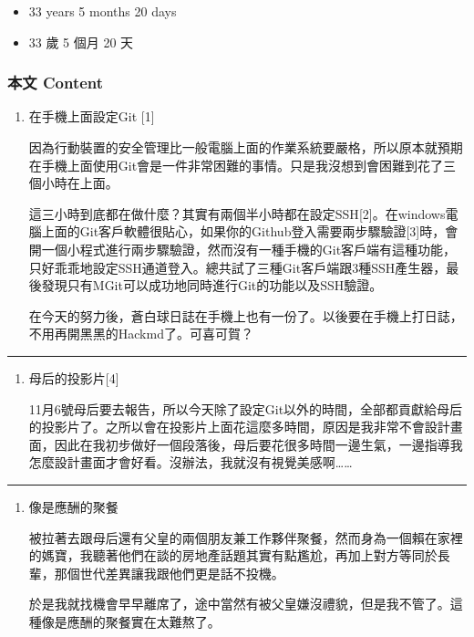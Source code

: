 \documentclass[
]{article}
\providecommand{\tightlist}{%
  \setlength{\itemsep}{0pt}\setlength{\parskip}{0pt}}
\begin{document}
\begin{itemize}
\tightlist
\item
  33 years 5 months 20 days
\item
  33 歲 5 個月 20 天
\end{itemize}

\hypertarget{ux672cux6587-content-12}{%
\subsubsection{本文 Content}\label{ux672cux6587-content-12}}

\begin{enumerate}
\def\labelenumi{\arabic{enumi}.}
\item
  在手機上面設定Git {[}1{]}

  因為行動裝置的安全管理比一般電腦上面的作業系統要嚴格，所以原本就預期在手機上面使用Git會是一件非常困難的事情。只是我沒想到會困難到花了三個小時在上面。

  這三小時到底都在做什麼？其實有兩個半小時都在設定SSH{[}2{]}。在windows電腦上面的Git客戶軟體很貼心，如果你的Github登入需要兩步驟驗證{[}3{]}時，會開一個小程式進行兩步驟驗證，然而沒有一種手機的Git客戶端有這種功能，只好乖乖地設定SSH通道登入。總共試了三種Git客戶端跟3種SSH產生器，最後發現只有MGit可以成功地同時進行Git的功能以及SSH驗證。

  在今天的努力後，蒼白球日誌在手機上也有一份了。以後要在手機上打日誌，不用再開黑黑的Hackmd了。可喜可賀？
\end{enumerate}

\begin{center}\rule{0.5\linewidth}{\linethickness}\end{center}

\begin{enumerate}
\def\labelenumi{\arabic{enumi}.}
\setcounter{enumi}{1}
\item
  母后的投影片{[}4{]}

  11月6號母后要去報告，所以今天除了設定Git以外的時間，全部都貢獻給母后的投影片了。之所以會在投影片上面花這麼多時間，原因是我非常不會設計畫面，因此在我初步做好一個段落後，母后要花很多時間一邊生氣，一邊指導我怎麼設計畫面才會好看。沒辦法，我就沒有視覺美感啊\ldots\ldots{}
\end{enumerate}

\begin{center}\rule{0.5\linewidth}{\linethickness}\end{center}

\begin{enumerate}
\def\labelenumi{\arabic{enumi}.}
\setcounter{enumi}{2}
\item
  像是應酬的聚餐

  被拉著去跟母后還有父皇的兩個朋友兼工作夥伴聚餐，然而身為一個賴在家裡的媽寶，我聽著他們在談的房地產話題其實有點尷尬，再加上對方等同於長輩，那個世代差異讓我跟他們更是話不投機。

  於是我就找機會早早離席了，途中當然有被父皇嫌沒禮貌，但是我不管了。這種像是應酬的聚餐實在太難熬了。
\end{enumerate}
\end{document}
